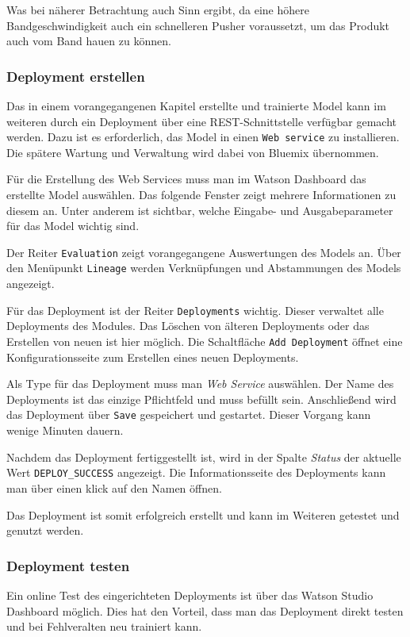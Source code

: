 Was bei näherer Betrachtung auch Sinn ergibt, da eine höhere Bandgeschwindigkeit auch ein schnelleren Pusher voraussetzt,
um das Produkt auch vom Band hauen zu können.

\subsubsection{Deployment erstellen}
Das in einem vorangegangenen Kapitel erstellte und trainierte Model kann im weiteren durch ein Deployment über eine
REST-Schnittstelle verfügbar gemacht werden. Dazu ist es erforderlich, das Model in einen \texttt{Web service} zu
installieren. Die spätere Wartung und Verwaltung wird dabei von Bluemix übernommen.

Für die Erstellung des Web Services muss man im Watson Dashboard das erstellte Model auswählen. Das folgende Fenster
zeigt mehrere Informationen zu diesem an. Unter anderem ist sichtbar, welche Eingabe- und Ausgabeparameter für das Model
wichtig sind.

Der Reiter \texttt{Evaluation} zeigt vorangegangene Auswertungen des Models an. Über den Menüpunkt \texttt{Lineage}
werden Verknüpfungen und Abstammungen des Models angezeigt.

Für das Deployment ist der Reiter \texttt{Deployments} wichtig. Dieser verwaltet alle Deployments des Modules. Das Löschen
von älteren Deployments oder das Erstellen von neuen ist hier möglich. Die Schaltfläche \texttt{Add Deployment} öffnet
eine Konfigurationsseite zum Erstellen eines neuen Deployments.

Als Type für das Deployment muss man \textit{Web Service} auswählen. Der Name des Deployments ist das einzige Pflichtfeld
und muss befüllt sein. Anschließend wird das Deployment über \texttt{Save} gespeichert und gestartet. Dieser Vorgang kann
wenige Minuten dauern.

Nachdem das Deployment fertiggestellt ist, wird in der Spalte \textit{Status} der aktuelle Wert \texttt{DEPLOY\_SUCCESS}
angezeigt. Die Informationsseite des Deployments kann man über einen klick auf den Namen öffnen.

Das Deployment ist somit erfolgreich erstellt und kann im Weiteren getestet und genutzt werden.

\subsubsection{Deployment testen}
Ein online Test des eingerichteten Deployments ist über das Watson Studio Dashboard möglich. Dies hat den Vorteil, dass
man das Deployment direkt testen und bei Fehlveralten neu trainiert kann.

